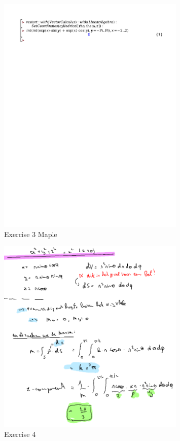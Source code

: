 \documentclass[a4paper]{report}
\begin{document}
\begin{figure}[H]
	\centering
	\includegraphics[width=0.8\textwidth]{exercises/huis_7_ex_3.pdf}
	\caption{Exercise 3 Maple}
	\label{fig:huis_7_ex_3}
\end{figure}

\begin{figure}[H]
	\centering
	\includegraphics[width=0.8\textwidth]{assets/huis_7_ex_4.png}
	\caption{Exercise 4}
	\label{fig:huis_7_ex_4}
\end{figure}
\end{document}
